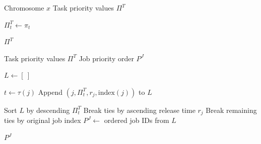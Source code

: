 \documentclass{article}
\begin{document}
\begin{algorithm}[H]
    \caption{Decode Task Priority}
    \label{alg:decode_task_priority}
    \begin{algorithmic}[1]
        \Require Chromosome $x$
        \Ensure Task priority values $\Pi^T$

            \State $\Pi^T_t \gets \pi_t$
        \EndFor

        \State \Return $\Pi^T$
    \end{algorithmic}
\end{algorithm}

\begin{algorithm}[H]
    \caption{Derive Job Priority Order}
    \label{alg:derive_job_priority_order}
    \begin{algorithmic}[1]
        \Require Task priority values $\Pi^T$
        \Ensure Job priority order $P^J$

        \State $L \gets [\ ]$

            \State $t \gets \tau(j)$
            \State Append $(j,\Pi^T_t,r_j,\mathrm{index}(j))$ to $L$
        \EndFor

        \State Sort $L$ by descending $\Pi^T_t$
        \State Break ties by ascending release time $r_j$
        \State Break remaining ties by original job index
        \State $P^J \gets$ ordered job IDs from $L$

        \State \Return $P^J$
    \end{algorithmic}
\end{algorithm}
\end{document}
